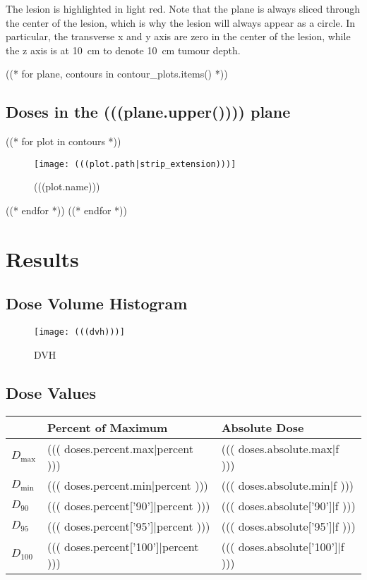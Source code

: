\documentclass[12pt]{article}
\begin{document}
The lesion is highlighted in light red. Note that the plane is always sliced through the center of the lesion, which is why the lesion will always appear as a circle. In particular, the transverse x and y axis are zero in the center of the lesion, while the z axis is at \SI{10}{\cm} to denote \SI{10}{\cm} tumour depth.

((* for plane, contours in contour_plots.items() *))
	\subsection{Doses in the (((plane.upper()))) plane}
	((* for plot in contours *))
	\begin{figure}[H]
	\centering
	\texttt{[image: (((plot.path|strip\_extension)))]}
	\caption{(((plot.name)))}
	\end{figure}
	((* endfor *))
((* endfor *))

\section{Results}

\subsection{Dose Volume Histogram}
\begin{figure}[H]
\centering
\texttt{[image: (((dvh)))]}
\caption{DVH}
\end{figure}

\subsection{Dose Values}
\begin{table}[H]
\begin{tabular}{l l l}
	& Percent of Maximum & Absolute Dose \\
	\hline
	$D_{\mathrm{max}}$ & ((( doses.percent.max|percent ))) & ((( doses.absolute.max|f ))) \\
	$D_{\mathrm{min}}$ & ((( doses.percent.min|percent ))) & ((( doses.absolute.min|f ))) \\
	$D_{90}$ & ((( doses.percent['90']|percent ))) & ((( doses.absolute['90']|f ))) \\
	$D_{95}$ & ((( doses.percent['95']|percent ))) & ((( doses.absolute['95']|f ))) \\
	$D_{100}$ & ((( doses.percent['100']|percent ))) & ((( doses.absolute['100']|f )))
\end{tabular}
\end{table}
\end{document}
